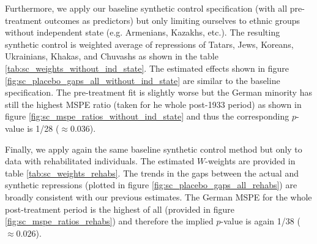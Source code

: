 Furthermore, we apply our baseline  synthetic control specification (with all pre-treatment outcomes as predictors) but only limiting ourselves to ethnic groups without independent state (e.g. Armenians, Kazakhs, etc.). The resulting synthetic control is weighted average of repressions of Tatars, Jews, Koreans, Ukrainians, Khakas, and Chuvashs as shown in the table \ref{tab:sc_weights_without_ind_state}. The estimated effects shown in figure \ref{fig:sc_placebo_gaps_all_without_ind_state} are  similar to the baseline specification. The pre-treatment fit is slightly worse but the German minority has still the  highest MSPE ratio (taken for he whole post-1933 period) as shown in  figure \ref{fig:sc_mspe_ratios_without_ind_state} and thus the corresponding $p$-value is  1/28 ($\approx 0.036$).

Finally, we apply again the same baseline synthetic control method but only to data with rehabilitated individuals. The estimated $W$-weights are provided in table \ref{tab:sc_weights_rehabs}. The trends in the gaps between the actual and synthetic repressions (plotted in figure  \ref{fig:sc_placebo_gaps_all_rehabs}) are broadly consistent with  our previous estimates. 
The German MSPE for the whole post-treatment period is the highest of all (provided in figure \ref{fig:sc_mspe_ratios_rehabs}) and therefore the implied $p$-value is again  1/38 ($\approx 0.026$).

%
%

